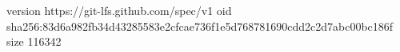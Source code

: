 version https://git-lfs.github.com/spec/v1
oid sha256:83d6a982fb34d43285583e2cfcae736f1e5d768781690cdd2c2d7abc00bc186f
size 116342
